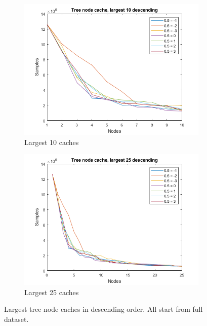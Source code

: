 \begin{figure}
    \centering
    \begin{subfigure}[b]{.49\textwidth}
        \centering
        \includegraphics[width=\textwidth]{figures/treenodecache-10.png}
        \caption{Largest 10 caches}
        \label{sfig:tree:treecache10}
    \end{subfigure}
    \hfill
    \begin{subfigure}[b]{.49\textwidth}
        \centering
        \includegraphics[width=\textwidth]{figures/treenodecache-25.png}
        \caption{Largest 25 caches}
        \label{sfig:tree:treecache25}
    \end{subfigure}
    \caption{Largest tree node caches in descending order. All start from full dataset.}
    \label{fig:tree:treecache}
\end{figure}


